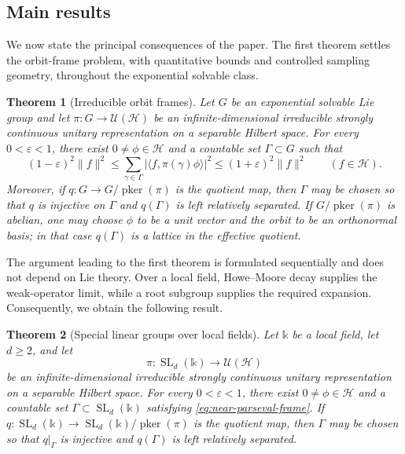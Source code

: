\documentclass[reqno]{amsart}
\numberwithin{equation}{section}
\newtheorem{theorem}{Theorem}[section]
\theoremstyle{definition}
\theoremstyle{remark}
\newcommand{\cH}{\mathcal H}
\newcommand{\U}{\mathcal U}
\newcommand{\pker}{\operatorname{pker}}
\begin{document}
\subsection{Main results}

We now state the principal consequences of the paper.  The first theorem
settles the orbit-frame problem, with quantitative bounds and controlled
sampling geometry, throughout the exponential solvable class.

\begin{theorem}[Irreducible orbit frames]\label{thm:main}
Let $G$ be an exponential solvable Lie group and let
$\pi:G\to\U(\cH)$ be an infinite-dimensional irreducible strongly continuous
unitary representation on a separable Hilbert space.  For every
$0<\varepsilon<1$,
there exist $0\neq\phi\in\cH$ and a countable set $\Gamma\subset G$ such
that
\begin{equation}\label{eq:near-parseval-frame}
 (1-\varepsilon)^2\|f\|^2
 \leq \sum_{\gamma\in\Gamma}
       |\langle f,\pi(\gamma)\phi\rangle|^2
 \leq (1+\varepsilon)^2\|f\|^2
 \qquad(f\in\cH).
\end{equation}
Moreover, if $q:G\to G/\pker(\pi)$ is the quotient map, then $\Gamma$
may be chosen so that $q$ is injective on $\Gamma$ and $q(\Gamma)$ is left
relatively separated.  If $G/\pker(\pi)$ is abelian, one may choose $\phi$ to be a
unit vector and the orbit to be an orthonormal basis; in that case
$q(\Gamma)$ is
a lattice in the effective quotient.
\end{theorem}

The argument leading to the first theorem is formulated sequentially and does
not depend on Lie theory.  Over a local field, Howe--Moore decay supplies the
weak-operator limit, while a root subgroup supplies the required expansion.
Consequently, we obtain the following result.

\begin{theorem}[Special linear groups over local fields]
\label{thm:local-field-main}
Let $\mathbb k$ be a local field, let $d\geq2$, and let
\[
 \pi:\operatorname{SL}_d(\mathbb k)\longrightarrow\U(\cH)
\]
be an infinite-dimensional irreducible strongly continuous unitary
representation on a separable Hilbert space.  For every
$0<\varepsilon<1$, there exist $0\neq\phi\in\cH$ and a countable set
$\Gamma\subset\operatorname{SL}_d(\mathbb k)$ satisfying
\eqref{eq:near-parseval-frame}.  If
$q:\operatorname{SL}_d(\mathbb k)\to
\operatorname{SL}_d(\mathbb k)/\pker(\pi)$ is the quotient map, then
$\Gamma$ may be chosen so that $q|_\Gamma$ is injective and $q(\Gamma)$ is
left relatively separated.
\end{theorem}
\end{document}
